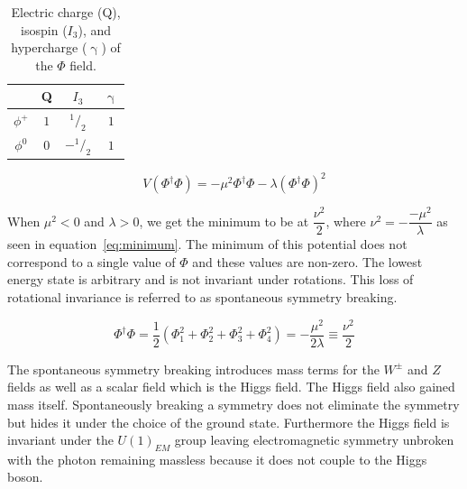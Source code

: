 \begin{center}
\begin{table}[htb]
\caption{\small   Electric charge (Q), isospin ($I_{3}$), and hypercharge ($\upgamma$) of the $\Phi$ field.
}
\begin{center}
\begin{tabular}{ c c c c }
\hline     & Q    & $I_{3}$ & $\upgamma$ \\ \hline \hline
$\phi^+$   & $1$  & $^1/_2$  & $1$ \\
$\phi^0$   & $0$  & $-^1/_2$ & $1$ \\ \hline
\hline
\end{tabular}
\end{center}
\label{tab:phi_QuantumNumbers}
\end{table}

\end{center}

\begin{equation} V(\Phi^{\dagger} \Phi) = -\mu^2 \Phi^{\dagger} \Phi - \lambda (\Phi^{\dagger} \Phi)^2 \label{eq:potential}\end{equation}

When $\mu^2 < 0$ and $\lambda > 0$, we get the minimum to be at $\dfrac{\nu^2}{2}$, where $\nu^2 = -\dfrac{-\mu^2}{\lambda}$ as seen in equation~\ref{eq:minimum}.  The minimum of this potential does not correspond to a single value of $\Phi$ and these values are non-zero. The lowest energy state is arbitrary and is not invariant under rotations.  This loss of rotational invariance is referred to as spontaneous symmetry breaking.  

\begin{equation} \Phi^{\dagger} \Phi = \dfrac{1}{2} ( \Phi^2_1 + \Phi^2_2 + \Phi^2_3 + \Phi^2_4) = -\dfrac{\mu^2}{2\lambda} \equiv \dfrac{\nu^2}{2} \label{eq:minimum}\end{equation}

The spontaneous symmetry breaking introduces mass terms for the $W^{\pm}$ and $Z$ fields as well as a scalar field which is the Higgs field.  The Higgs field also gained mass itself.  Spontaneously breaking a symmetry does not eliminate the symmetry but hides it under the choice of the ground state.  Furthermore the Higgs field is invariant under the $U(1)_{EM}$ group leaving electromagnetic symmetry unbroken with the photon remaining massless because it does not couple to the Higgs boson.

